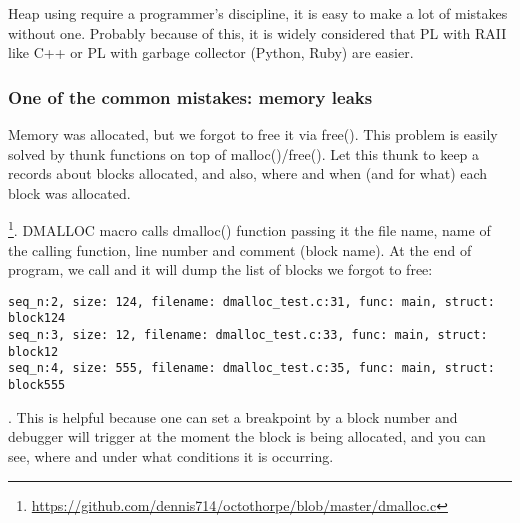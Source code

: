 {Heap using require a programmer's discipline, it is easy to make a lot
of mistakes without one}.
{Probably because of this, it is widely considered that \ac{PL} with 
\ac{RAII} like C++
or \ac{PL} with garbage collector (Python, Ruby) are easier}.

\subsubsection{
{One of the common mistakes: memory leaks}}

{Memory was allocated, but we forgot to free it via} free().
{This problem is easily solved by thunk functions on top of
malloc()/free()}.
{Let this thunk to keep a records about blocks allocated, and also,
where and when (and for what) each block was allocated}.

\footnote{\url{https://github.com/dennis714/octothorpe/blob/master/dmalloc.c}}. 
{DMALLOC macro calls dmalloc() function passing it the file name, name of the calling function,
line number and comment (block name)}.
{At the end of program, we call}
 
{and it will dump the list of blocks we forgot to free}:

\begin{lstlisting}
seq_n:2, size: 124, filename: dmalloc_test.c:31, func: main, struct: block124
seq_n:3, size: 12, filename: dmalloc_test.c:33, func: main, struct: block12
seq_n:4, size: 555, filename: dmalloc_test.c:35, func: main, struct: block555
\end{lstlisting}

.
{This is helpful because one can set a breakpoint by a block number and debugger will trigger at the moment
the block is being allocated, and you can see, where and under what conditions it is occurring}.

